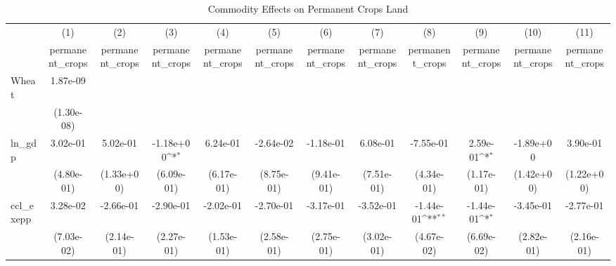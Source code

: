 \begin{table}[htbp]\centering
\def\sym#1{\ifmmode^{#1}\else\(^{#1}\)\fi}
\caption{Commodity Effects on Permanent Crops Land}
\begin{tabular}{l*{11}{c}}
\hline\hline
            &\multicolumn{1}{c}{(1)}&\multicolumn{1}{c}{(2)}&\multicolumn{1}{c}{(3)}&\multicolumn{1}{c}{(4)}&\multicolumn{1}{c}{(5)}&\multicolumn{1}{c}{(6)}&\multicolumn{1}{c}{(7)}&\multicolumn{1}{c}{(8)}&\multicolumn{1}{c}{(9)}&\multicolumn{1}{c}{(10)}&\multicolumn{1}{c}{(11)}\\
            &\multicolumn{1}{c}{permanent\_crops}&\multicolumn{1}{c}{permanent\_crops}&\multicolumn{1}{c}{permanent\_crops}&\multicolumn{1}{c}{permanent\_crops}&\multicolumn{1}{c}{permanent\_crops}&\multicolumn{1}{c}{permanent\_crops}&\multicolumn{1}{c}{permanent\_crops}&\multicolumn{1}{c}{permanent\_crops}&\multicolumn{1}{c}{permanent\_crops}&\multicolumn{1}{c}{permanent\_crops}&\multicolumn{1}{c}{permanent\_crops}\\
\hline
Wheat       &    1.87e-09         &                     &                     &                     &                     &                     &                     &                     &                     &                     &                     \\
            &  (1.30e-08)         &                     &                     &                     &                     &                     &                     &                     &                     &                     &                     \\
[1em]
ln\_gdp      &    3.02e-01         &    5.02e-01         &   -1.18e+00\sym{*}  &    6.24e-01         &   -2.64e-02         &   -1.18e-01         &    6.08e-01         &   -7.55e-01         &    2.59e-01\sym{*}  &   -1.89e+00         &    3.90e-01         \\
            &  (4.80e-01)         &  (1.33e+00)         &  (6.09e-01)         &  (6.17e-01)         &  (8.75e-01)         &  (9.41e-01)         &  (7.51e-01)         &  (4.34e-01)         &  (1.17e-01)         &  (1.42e+00)         &  (1.22e+00)         \\
[1em]
ccl\_exepp   &    3.28e-02         &   -2.66e-01         &   -2.90e-01         &   -2.02e-01         &   -2.70e-01         &   -3.17e-01         &   -3.52e-01         &   -1.44e-01\sym{**} &   -1.44e-01\sym{*}  &   -3.45e-01         &   -2.77e-01         \\
            &  (7.03e-02)         &  (2.14e-01)         &  (2.27e-01)         &  (1.53e-01)         &  (2.58e-01)         &  (2.75e-01)         &  (3.02e-01)         &  (4.67e-02)         &  (6.69e-02)         &  (2.82e-01)         &  (2.16e-01)         \\

\end{tabular}
\end{table}
